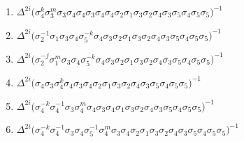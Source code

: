 \begin{enumerate}
    \item $\displaystyle \Delta^{2i} \big( \allowbreak\sigma_{4}^k\allowbreak\sigma_{3}^m\allowbreak\sigma_{3}\allowbreak\sigma_{4}\allowbreak\sigma_{4}\allowbreak\sigma_{3}\allowbreak\sigma_{4}\allowbreak\sigma_{4}\allowbreak\sigma_{2}\allowbreak\sigma_{1}\allowbreak\sigma_{3}\allowbreak\sigma_{2}\allowbreak\sigma_{4}\allowbreak\sigma_{3}\allowbreak\sigma_{5}\allowbreak\sigma_{4}\allowbreak\sigma_{5}\allowbreak\sigma_{5} \big)^{-1}$
    \item $\displaystyle \Delta^{2i} \big( \allowbreak\sigma_{2}^{-1}\allowbreak\sigma_{1}\allowbreak\sigma_{3}\allowbreak\sigma_{4}\allowbreak\sigma_{5}^{-k}\allowbreak\sigma_{4}\allowbreak\sigma_{3}\allowbreak\sigma_{2}\allowbreak\sigma_{1}\allowbreak\sigma_{3}\allowbreak\sigma_{2}\allowbreak\sigma_{4}\allowbreak\sigma_{3}\allowbreak\sigma_{5}\allowbreak\sigma_{4}\allowbreak\sigma_{5}\allowbreak\sigma_{5} \big)^{-1}$
    \item $\displaystyle \Delta^{2i} \big( \allowbreak\sigma_{2}^{-j}\allowbreak\sigma_{1}^m\allowbreak\sigma_{3}\allowbreak\sigma_{4}\allowbreak\sigma_{5}^{-k}\allowbreak\sigma_{4}\allowbreak\sigma_{3}\allowbreak\sigma_{2}\allowbreak\sigma_{1}\allowbreak\sigma_{3}\allowbreak\sigma_{2}\allowbreak\sigma_{4}\allowbreak\sigma_{3}\allowbreak\sigma_{5}\allowbreak\sigma_{4}\allowbreak\sigma_{5}\allowbreak\sigma_{5} \big)^{-1}$
    \item $\displaystyle \Delta^{2i} \big( \allowbreak\sigma_{4}\allowbreak\sigma_{3}\allowbreak\sigma_{4}^k\allowbreak\sigma_{4}\allowbreak\sigma_{3}\allowbreak\sigma_{4}\allowbreak\sigma_{2}\allowbreak\sigma_{1}\allowbreak\sigma_{3}\allowbreak\sigma_{2}\allowbreak\sigma_{4}\allowbreak\sigma_{3}\allowbreak\sigma_{5}\allowbreak\sigma_{4}\allowbreak\sigma_{5}\allowbreak\sigma_{5} \big)^{-1}$
    \item $\displaystyle \Delta^{2i} \big( \allowbreak\sigma_{4}^{-k}\allowbreak\sigma_{4}^{-1}\allowbreak\sigma_{3}\allowbreak\sigma_{4}^m\allowbreak\sigma_{4}\allowbreak\sigma_{3}\allowbreak\sigma_{4}\allowbreak\sigma_{1}\allowbreak\sigma_{3}\allowbreak\sigma_{2}\allowbreak\sigma_{4}\allowbreak\sigma_{3}\allowbreak\sigma_{5}\allowbreak\sigma_{4}\allowbreak\sigma_{5}\allowbreak\sigma_{5} \big)^{-1}$
    \item $\displaystyle \Delta^{2i} \big( \allowbreak\sigma_{4}^{-k}\allowbreak\sigma_{4}^{-1}\allowbreak\sigma_{3}\allowbreak\sigma_{4}\allowbreak\sigma_{5}^{-1}\allowbreak\sigma_{4}^m\allowbreak\sigma_{3}\allowbreak\sigma_{4}\allowbreak\sigma_{2}\allowbreak\sigma_{1}\allowbreak\sigma_{3}\allowbreak\sigma_{2}\allowbreak\sigma_{4}\allowbreak\sigma_{3}\allowbreak\sigma_{5}\allowbreak\sigma_{4}\allowbreak\sigma_{5}\allowbreak\sigma_{5} \big)^{-1}$
\end{enumerate}
\endgroup


